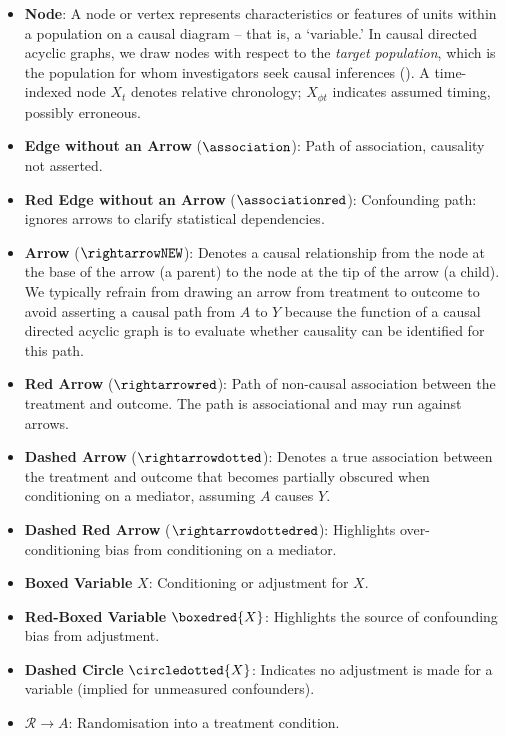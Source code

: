 \documentclass[
  single column]{article}
\begin{document}
\begin{itemize}
\item
  \textbf{Node}: A node or vertex represents characteristics or features
  of units within a population on a causal diagram -- that is, a
  `variable.' In causal directed acyclic graphs, we draw nodes with
  respect to the \emph{target population}, which is the population for
  whom investigators seek causal inferences
  (). A time-indexed
  node \(X_t\) denotes relative chronology; \(X_{\phi t}\) indicates
  assumed timing, possibly erroneous.
\item
  \textbf{Edge without an Arrow} (\(\association\)): Path of
  association, causality not asserted.
\item
  \textbf{Red Edge without an Arrow} (\(\associationred\)): Confounding
  path: ignores arrows to clarify statistical dependencies.
\item
  \textbf{Arrow} (\(\rightarrowNEW\)): Denotes a causal relationship
  from the node at the base of the arrow (a parent) to the node at the
  tip of the arrow (a child). We typically refrain from drawing an arrow
  from treatment to outcome to avoid asserting a causal path from \(A\)
  to \(Y\) because the function of a causal directed acyclic graph is to
  evaluate whether causality can be identified for this path.
\item
  \textbf{Red Arrow} (\(\rightarrowred\)): Path of non-causal
  association between the treatment and outcome. The path is
  associational and may run against arrows.
\item
  \textbf{Dashed Arrow} (\(\rightarrowdotted\)): Denotes a true
  association between the treatment and outcome that becomes partially
  obscured when conditioning on a mediator, assuming \(A\) causes \(Y\).
\item
  \textbf{Dashed Red Arrow} (\(\rightarrowdottedred\)): Highlights
  over-conditioning bias from conditioning on a mediator.
\item
  \textbf{Boxed Variable} \(\boxed{X}\): Conditioning or adjustment for
  \(X\).
\item
  \textbf{Red-Boxed Variable} \(\boxedred{X}\): Highlights the source of
  confounding bias from adjustment.
\item
  \textbf{Dashed Circle} \(\circledotted{X}\): Indicates no adjustment
  is made for a variable (implied for unmeasured confounders).
\item
  \textbf{\(\mathcal{R} \rightarrow A\)}: Randomisation into a treatment
  condition.
\end{itemize}
\end{document}
